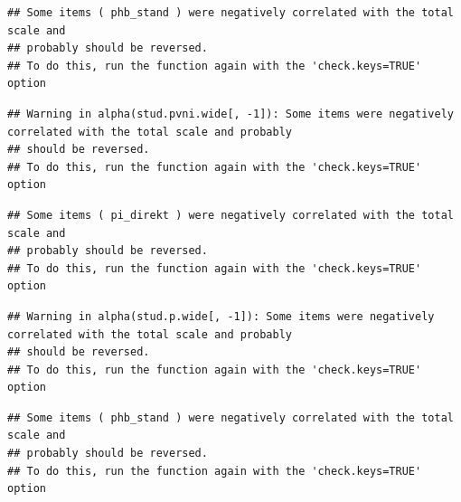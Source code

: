 \documentclass[
  english,
  man,floatsintext]{apa6}
\begin{document}
\begin{verbatim}
## Some items ( phb_stand ) were negatively correlated with the total scale and 
## probably should be reversed.  
## To do this, run the function again with the 'check.keys=TRUE' option
\end{verbatim}

\begin{verbatim}
## Warning in alpha(stud.pvni.wide[, -1]): Some items were negatively correlated with the total scale and probably 
## should be reversed.  
## To do this, run the function again with the 'check.keys=TRUE' option
\end{verbatim}

\begin{verbatim}
## Some items ( pi_direkt ) were negatively correlated with the total scale and 
## probably should be reversed.  
## To do this, run the function again with the 'check.keys=TRUE' option
\end{verbatim}

\begin{verbatim}
## Warning in alpha(stud.p.wide[, -1]): Some items were negatively correlated with the total scale and probably 
## should be reversed.  
## To do this, run the function again with the 'check.keys=TRUE' option
\end{verbatim}

\begin{verbatim}
## Some items ( phb_stand ) were negatively correlated with the total scale and 
## probably should be reversed.  
## To do this, run the function again with the 'check.keys=TRUE' option
\end{verbatim}
\end{document}
